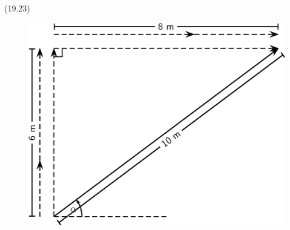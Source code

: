 {\begin{mdframed}[linewidth=4, leftmargin=40, rightmargin=40]
\begin{exercise}
\begin{enumerate}[noitemsep, label=\textbf{Step} \textbf{\arabic*}. ]
{\begin{minipage}{\columnwidth}
    \parbox[t]{48pt}{\raggedleft 
    (19.23)}
    \end{minipage}\vspace{12pt}\par
    }%
    
        
        \label{m38819*id195844}
          
    \setcounter{subfigure}{0}


	\begin{figure}[H] %
    \begin{center}
    \label{m38819*id195847!!!underscore!!!media}\label{m38819*id195847!!!underscore!!!printimage}\includegraphics{col11305.imgs/m38819_PG11C1_068.png} %
        
      \vspace{2pt}
    \vspace{.1in}
    
    \end{center}

 \end{figure}   

    \addtocounter{footnote}{-0}
    

\end{enumerate}
\end{exercise}
\end{mdframed}}
